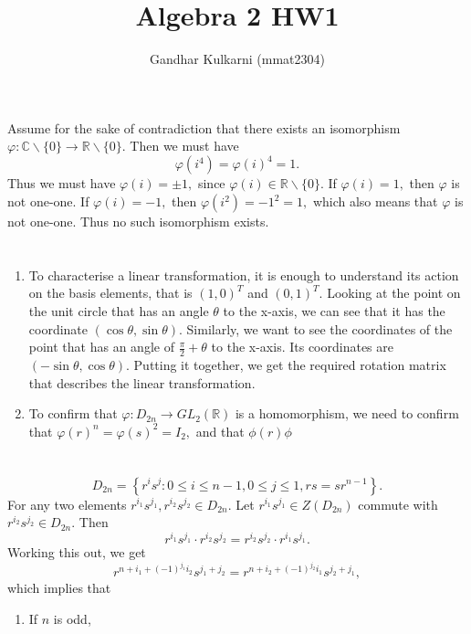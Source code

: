 \documentclass{article}
\title{Algebra 2 HW1} %
\author{Gandhar Kulkarni (mmat2304)} %
\date{} %
\begin{document}
\maketitle %


\section{} %
Assume for the sake of contradiction that there exists an isomorphism $\varphi: \mathbb{C}\backslash \{0\} \rightarrow \mathbb{R}\backslash \{0\}.$ Then we 
must have $$\varphi(i^4)=\varphi(i)^4=1.$$ Thus we must have $\varphi(i)=\pm 1,$ since $\varphi(i) \in \mathbb{R}\backslash \{0\}.$ If $\varphi(i)=1,$ then 
$\varphi$ is not one-one. If $\varphi(i)=-1,$ then $\varphi(i^2)=-1^2=1,$ which also means that $\varphi$ is not one-one. Thus no such isomorphism exists.

\section{} %
\begin{enumerate}
	\item To characterise a linear transformation, it is enough to understand its action on the basis elements, that is $(1,0)^T$ and $(0,1)^T.$ Looking at 
	the point on the unit circle that has an angle $\theta$ to the x-axis, we can see that it has the coordinate $(\cos \theta, \sin \theta).$ Similarly, we 
	want to see the coordinates of the point that has an angle of $\frac{\pi}{2}+ \theta$ to the x-axis. Its coordinates are $(-\sin \theta, \cos \theta).$ 
	Putting it together, we get the required rotation matrix that describes the linear transformation.
	\item To confirm that $\varphi:D_{2n} \rightarrow GL_2(\mathbb{R})$ is a homomorphism, we need to confirm that $\varphi(r)^n=\varphi(s)^2=I_{2},$ and 
	that $\phi(r)\phi$
\end{enumerate}
\section{} %
$$D_{2n}= \left\{ r^is^j : 0 \leq i \leq n-1, 0 \leq j \leq 1, rs=sr^{n-1} \right\}.$$
For any two elements $r^{i_1}s^{j_1}, r^{i_2}s^{j_2} \in D_{2n}.$ %
Let $r^{i_1}s^{j_1} \in Z(D_{2n})$ commute with $r^{i_2}s^{j_2} \in D_{2n}.$ Then $$r^{i_1}s^{j_1} \cdot r^{i_2}s^{j_2}= 
r^{i_2}s^{j_2} \cdot r^{i_1}s^{j_1}.$$
Working this out, we get $$r^{n+i_1+(-1)^{j_1}i_2} s^{j_1+j_2}=r^{n+i_2+(-1)^{j_2}i_1} s^{j_2+j_1}, $$ which implies that 
\begin{enumerate}
	\item If $n$ is odd, 
\end{enumerate}
\end{document}
